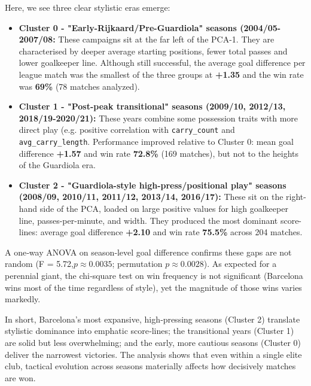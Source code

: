 \documentclass[11pt]{article}
\begin{document}
Here, we see three clear stylistic eras emerge:
\begin{itemize}
    \item \textbf{Cluster 0 - "Early-Rijkaard/Pre-Guardiola" seasons (2004/05-2007/08:} These campaigns sit at the far left of the PCA-1. They are characterised by deeper average starting positions, fewer total passes and lower goalkeeper line. Although still successful, the average goal difference per league match was the smallest of the three groups at \textbf{+1.35} and the win rate was \textbf{69\%} (78 matches analyzed). 
    \item \textbf{Cluster 1 - "Post-peak transitional" seasons (2009/10, 2012/13, 2018/19-2020/21):} These years combine some possession traits with more direct play (e.g. positive correlation with \texttt{carry\_count} and \texttt{avg\_carry\_length}. Performance improved relative to Cluster 0: mean goal difference \textbf{+1.57} and win rate \textbf{72.8\%} (169 matches), but not to the heights of the Guardiola era. 
    \item \textbf{Cluster 2 - "Guardiola-style high-press/positional play" seasons (2008/09, 2010/11, 2011/12, 2013/14, 2016/17):} These sit on the right-hand side of the PCA, loaded on large positive values for high goalkeeper line, passes-per-minute, and width. They produced the most dominant score-lines: average goal difference \textbf{+2.10} and win rate \textbf{75.5\%} across 204 matches. 
\end{itemize}

A one‑way ANOVA on season‑level goal difference confirms these gaps are not random (F = 5.72,$p \approx 0.0035$; permutation $p \approx0.0028$). As expected for a perennial giant, the chi‑square test on win frequency is not significant (Barcelona wins most of the time regardless of style), yet the magnitude of those wins varies markedly.
\newline

In short, Barcelona’s most expansive, high‑pressing seasons (Cluster 2) translate stylistic dominance into emphatic score‑lines; the transitional years (Cluster 1) are solid but less overwhelming; and the early, more cautious seasons (Cluster 0) deliver the narrowest victories. The analysis shows that even within a single elite club, tactical evolution across seasons materially affects how decisively matches are won.
\end{document}
